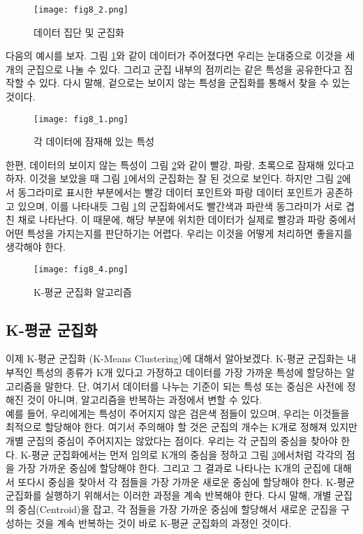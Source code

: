 \documentclass[a4paper]{oblivoir}
\begin{document}
\begin{figure}[ht] \centering 
\texttt{[image: fig8\_2.png]} 
\caption{데이터 집단 및 군집화}
\label{fig:8-2}
\end{figure} 

다음의 예시를 보자. 그림 \ref{fig:8-2}와 같이 데이터가 주어졌다면 우리는 눈대중으로 이것을 세 개의 군집으로 나눌 수 있다. 그리고 군집 내부의 점끼리는 같은 특성을 공유한다고 짐작할 수 있다. 다시 말해, 겉으로는 보이지 않는 특성을 군집화를 통해서 찾을 수 있는 것이다.  \\

\begin{figure}[ht] \centering 
\texttt{[image: fig8\_1.png]} 
\caption{각 데이터에 잠재해 있는 특성}
\label{fig:8-1}
\end{figure} 

한편, 데이터의 보이지 않는 특성이 그림 \ref{fig:8-1}와 같이 빨강, 파랑, 초록으로 잠재해 있다고 하자. 이것을 보았을 때 그림 \ref{fig:8-2}에서의 군집화는 잘 된 것으로 보인다. 하지만 그림 \ref{fig:8-1}에서 동그라미로 표시한 부분에서는 빨강 데이터 포인트와 파랑 데이터 포인트가 공존하고 있으며, 이를 나타내듯 그림 \ref{fig:8-2}의 군집화에서도 빨간색과 파란색 동그라미가 서로 겹친 채로 나타난다. 이 때문에, 해당 부분에 위치한 데이터가 실제로 빨강과 파랑 중에서 어떤 특성을 가지는지를 판단하기는 어렵다. 우리는 이것을 어떻게 처리하면 좋을지를 생각해야 한다. \\

\begin{figure}[ht] \centering 
\texttt{[image: fig8\_4.png]} 
\caption{K-평균 군집화 알고리즘}
\label{fig:8-4}
\end{figure} 

\subsection{K-평균 군집화}

이제 K-평균 군집화 (K-Means Clustering)에 대해서 알아보겠다. K-평균 군집화는 내부적인 특성의 종류가 K개 있다고 가정하고 데이터를 가장 가까운 특성에 할당하는 알고리즘을 말한다. 단, 여기서 데이터를 나누는 기준이 되는 특성 또는 중심은 사전에 정해진 것이 아니며, 알고리즘을 반복하는 과정에서 변할 수 있다. \\

예를 들어, 우리에게는 특성이 주어지지 않은 검은색 점들이 있으며, 우리는 이것들을 최적으로 할당해야 한다. 여기서 주의해야 할 것은 군집의 개수는 K개로 정해져 있지만 개별 군집의 중심이 주어지지는 않았다는 점이다. 우리는 각 군집의 중심을 찾아야 한다. K-평균 군집화에서는 먼저 임의로 K개의 중심을 정하고 그림 \ref{fig:8-4}에서처럼 각각의 점을 가장 가까운 중심에 할당해야 한다. 그리고 그 결과로 나타나는 K개의 군집에 대해서 또다시 중심을 찾아서 각 점들을 가장 가까운 새로운 중심에 할당해야 한다. K-평균 군집화를 실행하기 위해서는 이러한 과정을 계속 반복해야 한다. 다시 말해, 개별 군집의 중심(Centroid)을 잡고, 각 점들을 가장 가까운 중심에 할당해서 새로운 군집을 구성하는 것을 계속 반복하는 것이 바로 K-평균 군집화의 과정인 것이다. \\   
\end{document}
